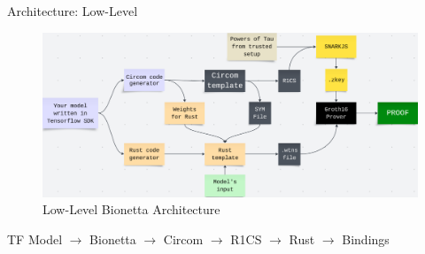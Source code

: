 \documentclass{zkdl-presentation-template}
\begin{document}
    \begin{frame}{Architecture: Low-Level}
        \begin{figure}
            \centering
            \includegraphics[width=\textwidth]{images/bionetta-flow.png}
            \caption{Low-Level Bionetta Architecture}
        \end{figure}

        \begin{center}
            TF Model $\to$ Bionetta $\to$ Circom $\to$ R1CS $\to$ Rust $\to$ Bindings
        \end{center}

        \begin{center}
            \setlength{\fboxrule}{1.5pt}
        \end{center}
    \end{frame}
\end{document}
